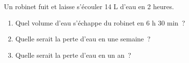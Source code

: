 \documentclass[exercice]{thedocument}%
\begin{document}
%
Un robinet fuit et laisse s'écouler 14 L d'eau en 2 heures.
\begin{enumerate}
    \item Quel volume d'eau s'échappe du robinet en 6 h 30 min~?
    \item Quelle serait la perte d'eau en une semaine~?
    \item Quelle serait la perte d'eau en un an~?
\end{enumerate}
\end{document}
